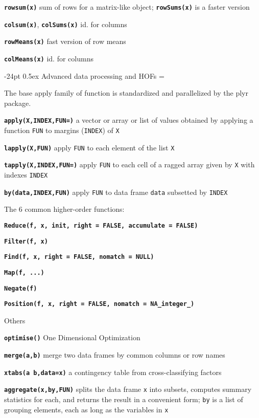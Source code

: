\documentclass[10pt,landscape]{article}
\makeatletter
\renewcommand\section{\@startsection{section}{1}{0mm}%
                                     {-24pt}%
                                     {0.5ex}%
                                {\color{blue}\normalfont\large\bfseries}}
\newcommand{\code}{\texttt}
\newcommand{\bcode}[1]{\texttt{\textbf{#1}}}
\makeatother
\begin{document}
\begin{multicols*}{3}
\bcode{rowsum(x)} sum of rows for a matrix-like object;
\bcode{rowSums(x)} is a faster version

\bcode{colsum(x)}, \bcode{colSums(x)} id. for columns

\bcode{rowMeans(x)} fast version of row means

\bcode{colMeans(x)} id. for columns

\section{Advanced data processing and HOFs}
\everypar={\hangindent=9mm}

The base apply family of function is standardized and parallelized by the plyr package.

\bcode{apply(X,INDEX,FUN=)} a vector or array or list of values obtained by applying a
     function \code{FUN} to margins (\code{INDEX}) of \code{X}

\bcode{lapply(X,FUN)} apply \code{FUN} to each element of the list \code{X}

\bcode{tapply(X,INDEX,FUN=)} apply \code{FUN} to each cell
of a ragged array given by \code{X} with indexes \code{INDEX}

\bcode{by(data,INDEX,FUN)} apply \code{FUN} to data frame \code{data}
subsetted by \code{INDEX}

The 6 common higher-order functions:

\bcode{Reduce(f, x, init, right = FALSE, accumulate = FALSE)}

\bcode{Filter(f, x)}

\bcode{Find(f, x, right = FALSE, nomatch = NULL)}

\bcode{Map(f, ...)}

\bcode{Negate(f)}

\bcode{Position(f, x, right = FALSE, nomatch = NA\_integer\_)}

Others

\bcode{optimise()} One Dimensional Optimization

\bcode{merge(a,b)} merge two data frames by common columns or row names

\bcode{xtabs(a~b,data=x)} a contingency table from cross-classifying factors

\bcode{aggregate(x,by,FUN)} splits the data frame \code{x} into subsets, computes summary statistics for
     each, and returns the result in a convenient form; \code{by} is a
     list of grouping elements, each as long as the variables in \code{x}


\end{multicols*}
\end{document}
